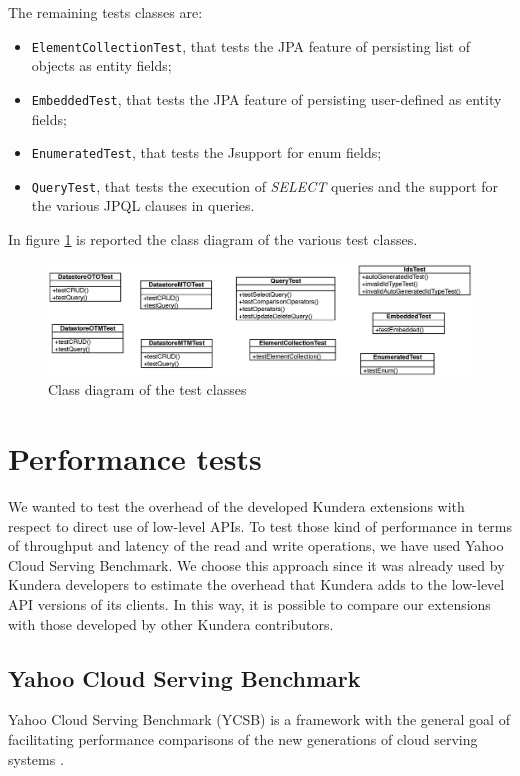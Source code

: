 \newparagraph The remaining tests classes are:
\begin{itemize}
\item \texttt{ElementCollectionTest}, that tests the JPA feature of persisting list of objects as entity fields;
\item \texttt{EmbeddedTest}, that tests the JPA feature of persisting user-defined as entity fields;
\item \texttt{EnumeratedTest}, that tests the Jsupport for enum fields;
\item \texttt{QueryTest}, that tests the execution of \textit{SELECT} queries and the support for the various JPQL clauses in queries.
\end{itemize}

\newparagraph In figure \ref{fig:test-uml} is reported the class diagram of the various test classes.

\begin{figure}[tbh]
  \centering
  \includegraphics[width=14cm]{images/test_uml}
  \caption{Class diagram of the test classes}
  \label{fig:test-uml}
\end{figure} 

\section{Performance tests}
\label{sec:performance}
We wanted to test the overhead of the developed Kundera extensions with respect to direct use of low-level APIs. To test those kind of performance in terms of throughput and latency of the read and write operations, we have used Yahoo Cloud Serving Benchmark.
We choose this approach since it was already used by Kundera developers to estimate the overhead that Kundera adds to the low-level API versions of its clients. In this way, it is possible to compare our extensions with those developed by other Kundera contributors.

\subsection{Yahoo Cloud Serving Benchmark}
Yahoo Cloud Serving Benchmark (YCSB) is a framework with the general goal of facilitating performance comparisons of the new generations of cloud serving systems \cite{paper:ycsb}.

